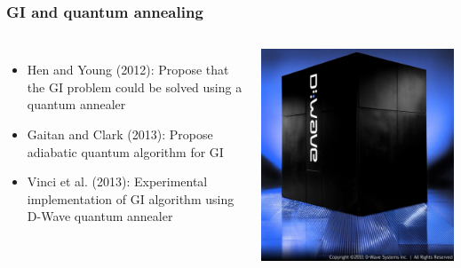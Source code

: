 \documentclass{beamer}
\begin{document}
\begin{frame}
  \frametitle{GI and quantum annealing}
  \begin{columns}
    \begin{itemize}
      \item Hen and Young (2012):
        Propose that the GI problem could be solved using a
        quantum annealer
      \item Gaitan and Clark (2013):
        Propose adiabatic quantum algorithm for GI
      \item Vinci et al. (2013):
        Experimental implementation of GI algorithm using D-Wave quantum
        annealer
    \end{itemize}
    \includegraphics[width=\textwidth]{d_wave_one_system}
  \end{columns}
\end{frame}
\end{document}
